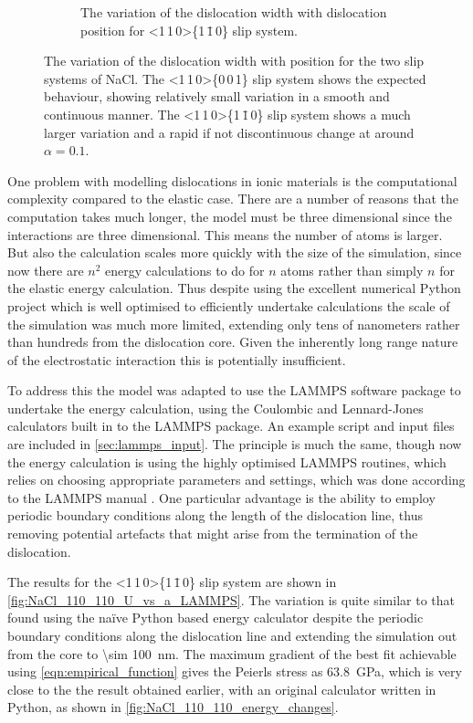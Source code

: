 \begin{figure}
\begin{subfigure}{0.4\textwidth}
\caption{The variation of the dislocation width with dislocation position for <1\,1\,0>\{1\,\={1}\,0\} slip system.\label{fig:NaCl_110_110_w_variation}}
\end{subfigure}
\caption[The variation of the dislocation width with position for NaCl.]{The variation of the dislocation width with position for the two slip systems of NaCl. The <1\,1\,0>\{0\,0\,1\} slip system shows the expected behaviour, showing relatively small variation in a smooth and continuous manner. The <1\,1\,0>\{1\,\={1}\,0\} slip system shows a much larger variation and a rapid if not discontinuous change at around $\alpha=0.1$.\label{fig:NaCl_w_vs_alpha}}
\end{figure}

One problem with modelling dislocations in ionic materials is the computational complexity compared to the elastic case. There are a number of reasons that the computation takes much longer, the model must be three dimensional since the interactions are three dimensional. This means the number of atoms is larger. But also the calculation scales more quickly with the size of the simulation, since now there are $n^2$ energy calculations to do for $n$ atoms rather than simply $n$ for the elastic energy calculation. Thus despite using the excellent numerical Python project \citep{Numpy2011} which is well optimised to efficiently undertake calculations the scale of the simulation was much more limited, extending only tens of nanometers rather than hundreds from the dislocation core. Given the inherently long range nature of the electrostatic interaction this is potentially insufficient.

To address this the model was adapted to use the LAMMPS \cite{LAMMPS_web} software package to undertake the energy calculation, using the Coulombic and Lennard-Jones calculators built in to the LAMMPS package. An example script and input files are included in \autoref{sec:lammps_input}. The principle is much the same, though now the energy calculation is using the highly optimised LAMMPS routines, which relies on choosing appropriate parameters and settings, which was done according to the LAMMPS manual \cite{LAMMPS_web}. One particular advantage is the ability to employ periodic boundary conditions along the length of the dislocation line, thus removing potential artefacts that might arise from the termination of the dislocation.

The results for the <1\,1\,0>\{1\,\={1}\,0\} slip system are shown in \autoref{fig:NaCl_110_110_U_vs_a_LAMMPS}. The variation is quite similar to that found using the na\"ive Python based energy calculator despite the periodic boundary conditions along the dislocation line and extending the simulation out from the core to \SI{\sim 100}{\nano\meter}. The maximum gradient of the best fit achievable using \autoref{eqn:empirical_function} gives the Peierls stress as \SI{63.8}{\giga\pascal}, which is very close to the the result obtained earlier, with an original calculator written in Python, as shown in \autoref{fig:NaCl_110_110_energy_changes}. 


